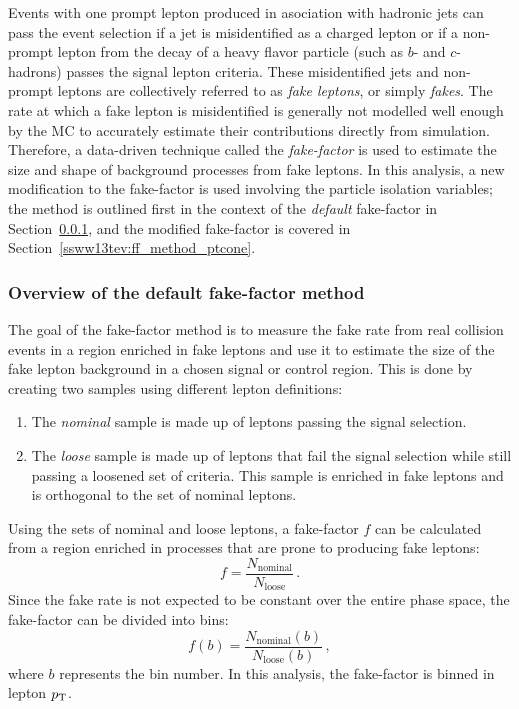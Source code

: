 Events with one prompt lepton produced in asociation with hadronic jets can pass the event selection if a jet is misidentified as a charged lepton or if a non-prompt lepton from the decay of a heavy flavor particle (such as $b$- and $c$-hadrons) passes the signal lepton criteria.
These misidentified jets and non-prompt leptons are collectively referred to as \emph{fake leptons}, or simply \emph{fakes}.
The rate at which a fake lepton is misidentified is generally not modelled well enough by the MC to accurately estimate their contributions directly from simulation.
Therefore, a data-driven technique called the \emph{fake-factor} is used to estimate the size and shape of background processes from fake leptons.
In this analysis, a new modification to the fake-factor is used involving the particle isolation variables; the method is outlined first in the context of the \emph{default} fake-factor in Section~\ref{ssww13tev:ff_method_default}, and the modified fake-factor is covered in Section~\ref{ssww13tev:ff_method_ptcone}.

%
\subsubsection{Overview of the default fake-factor method}\label{ssww13tev:ff_method_default}
The goal of the fake-factor method is to measure the fake rate from real collision events in a region enriched in fake leptons and use it to estimate the size of the fake lepton background in a chosen signal or control region.
This is done by creating two samples using different lepton definitions: 
\begin{enumerate}
\item The \emph{nominal} sample is made up of leptons passing the signal selection.
\item The \emph{loose} sample is made up of leptons that fail the signal selection while still passing a loosened set of criteria.  This sample is enriched in fake leptons and is orthogonal to the set of nominal leptons.
\end{enumerate}
Using the sets of nominal and loose leptons, a fake-factor $f$ can be calculated from a region enriched in processes that are prone to producing fake leptons:
\begin{equation}
f = \frac{N_{\textrm{nominal}}}{N_{\textrm{loose}}}\,.
\label{eq:ssww13tev_ff_default_unbinned}
\end{equation}
Since the fake rate is not expected to be constant over the entire phase space, the fake-factor can be divided into bins:
\begin{equation}
f(b) = \frac{N_{\textrm{nominal}}(b)}{N_{\textrm{loose}}(b)}\,,
\label{eq:ssww13tev_ff_default_binned}
\end{equation}
where $b$ represents the bin number.
In this analysis, the fake-factor is binned in lepton $p_{\mathrm{T}}$.

